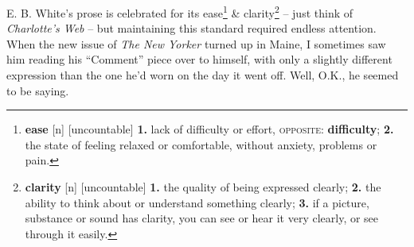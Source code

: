 \documentclass[oneside]{book}
\numberwithin{equation}{section}
\begin{document}
E. B. White's prose is celebrated for its ease\footnote{\textbf{ease} [n] [uncountable] \textbf{1.} lack of difficulty or effort, \textsc{opposite}: \textbf{difficulty}; \textbf{2.} the state of feeling relaxed or comfortable, without anxiety, problems or pain.} \& clarity\footnote{\textbf{clarity} [n] [uncountable] \textbf{1.} the quality of being expressed clearly; \textbf{2.} the ability to think about or understand something clearly; \textbf{3.} if a picture, substance or sound has clarity, you can see or hear it very clearly, or see through it easily.} -- just think of \textit{Charlotte's Web} -- but maintaining this standard required endless attention. When the new issue of \textit{The New Yorker} turned up in Maine, I sometimes saw him reading his ``Comment'' piece over to himself, with only a slightly different expression than the one he'd worn on the day it went off. Well, O.K., he seemed to be saying. 
\end{document}
